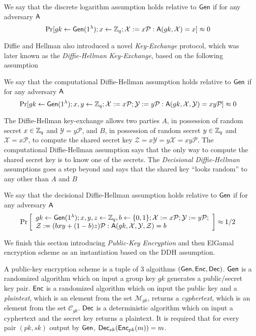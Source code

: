 \begin{definition}
We say that the discrete logarithm assumption holds relative to $\mathsf{Gen}$ if for any adversary $\mathsf{A}$
$$
\Pr[gk\gets\mathsf{Gen}(1^\lambda); x\gets\mathbb{Z}_q; \mathcal{X}:=x\mathcal{P}:\mathsf{A}(gk,\mathcal{X})=x]\approx 0
$$
\end{definition}
 
Diffie and Hellman also introduced a novel \emph{Key-Exchange} protocol, which was later known as the \emph{Diffie-Hellman Key-Exchange}, based on the following assumption

\begin{definition}
We say that the computational Diffie-Hellman assumption holds relative to $\mathsf{Gen}$ if for any adversary $\mathsf{A}$
$$
\Pr[gk\gets\mathsf{Gen}(1^\lambda); x,y\gets\mathbb{Z}_q; \mathcal{X}:=x\mathcal{P};\mathcal{Y}:=y\mathcal{P}:\mathsf{A}(gk,\mathcal{X},\mathcal{Y})=xy\mathcal{P}]\approx 0
$$
\end{definition}

The Diffie-Hellman key-exchange allows two parties $A$, in possession of random secret $x\in\mathbb{Z}_q$ and $\mathcal{Y}=y\mathcal{P}$, and $B$, in possession of random secret $y\in\mathbb{Z}_q$ and $\mathcal{X}=x\mathcal{P}$, to compute the shared secret key $\mathcal{Z}=x\mathcal{Y}=y\mathcal{X}=xy\mathcal{P}$. The computational Diffie-Hellman assumption says that the only way to compute the shared secret key is to know one of the secrets. The \emph{Decisional Diffie-Hellman} assumptions goes a step beyond and says that the shared key ``looks random'' to any other than $A$ and $B$

\begin{definition}
We say that the decisional Diffie-Hellman assumption holds relative to $\mathsf{Gen}$ if for any adversary $\mathsf{A}$
$$
\Pr\left[\begin{array}{l}
gk\gets\mathsf{Gen}(1^\lambda); x,y,z\gets\mathbb{Z}_q,b\gets\{0,1\};\mathcal{X}:=x\mathcal{P};\mathcal{Y}:=y\mathcal{P};\\
\mathcal{Z}:=(bxy+(1-b)z)\mathcal{P}:\mathsf{A}(gk,\mathcal{X},\mathcal{Y},\mathcal{Z})=b
\end{array}\right]\approx 1/2
$$
\end{definition}

We finish this section introducing \emph{Public-Key Encryption} and then ElGamal encryption scheme as an instantiation based on the DDH assumption.

A public-key encryption scheme is a tuple of 3 algoithms $(\mathsf{Gen},\mathsf{Enc},\mathsf{Dec})$. $\mathsf{Gen}$ is a randomized algorithm which on input a group key $gk$ generates a public/secret key pair. $\mathsf{Enc}$ is a randomized algorithm which on input the public key and a \emph{plaintext}, which is an element from the set $\mathcal{M}_{gk}$, returns a \emph{cyphertext}, which is an element from the set $\mathcal{C}_{gk}$. $\mathsf{Dec}$ is a deterministic algorithm which on input a cyphertext and the secret key returns a plaintext. It is required that for every pair $(pk,sk)$ output by $\mathsf{Gen}$, $\mathsf{Dec}_{sk}(\mathsf{Enc}_{pk}(m))=m$.

